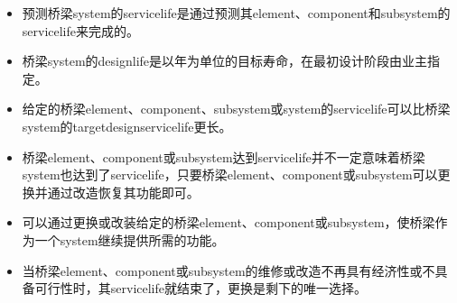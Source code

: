 \begin{itemize}
  \item 预测桥梁\gls*{system}的\gls*{servicelife}是通过预测其\gls*{element}、\gls*{component}和\gls*{subsystem}的\gls*{servicelife}来完成的。
  \item 桥梁\gls*{system}的\gls*{designlife}是以年为单位的目标寿命，在最初设计阶段由业主指定。
  \item 给定的桥梁\gls*{element}、\gls*{component}、\gls*{subsystem}或\gls*{system}的\gls*{servicelife}可以比桥梁\gls*{system}的\gls*{targetdesignservicelife}更长。
  \item 桥梁\gls*{element}、\gls*{component}或\gls*{subsystem}达到\gls*{servicelife}并不一定意味着桥梁\gls*{system}也达到了\gls*{servicelife}，只要桥梁\gls*{element}、\gls*{component}或\gls*{subsystem}可以更换并通过改造恢复其功能即可。
  \item 可以通过更换或改装给定的桥梁\gls*{element}、\gls*{component}或\gls*{subsystem}，使桥梁作为一个\gls*{system}继续提供所需的功能。
  \item 当桥梁\gls*{element}、\gls*{component}或\gls*{subsystem}的维修或改造不再具有经济性或不具备可行性时，其\gls*{servicelife}就结束了，更换是剩下的唯一选择。

\end{itemize}
